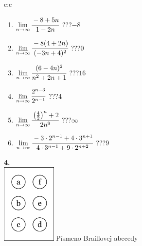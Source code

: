 \documentclass[10pt]{report}
\begin{document}
\begin{tabular}{c:c}
\begin{minipage}[c][104.5mm][t]{0.5\linewidth}
\begin{center}
\begin{minipage}{0.79\linewidth}
\begin{center}
\begin{varwidth}{\linewidth}
\begin{enumerate}
\normalsize
\item $\lim\limits_{n\to\infty}\cfrac{-8+5n}{1-2n}$\quad \dotfill\; ???\;\dotfill \quad $-8$
\item $\lim\limits_{n\to\infty}\cfrac{-8(4+2n)}{(-3n+4)^2}$\quad \dotfill\; ???\;\dotfill \quad $0$
\item $\lim\limits_{n\to\infty}\cfrac{(6-4n)^2}{n^2+2n+1}$\quad \dotfill\; ???\;\dotfill \quad $16$
\item $\lim\limits_{n\to\infty}\cfrac{2^{n-3}}{2^{n-1}}$\quad \dotfill\; ???\;\dotfill \quad $4$
\item $\lim\limits_{n\to\infty}\cfrac{\left(\frac{4}{2}\right)^n +2}{2n^{9}}$\quad \dotfill\; ???\;\dotfill \quad $\infty$
\item $\lim\limits_{n\to\infty}\cfrac{-3\cdot 2^{n-1}+4\cdot 3^{n+1}}{4\cdot 3^{n-1}+9\cdot 2^{n+2}}$\quad \dotfill\; ???\;\dotfill \quad $9$
\end{enumerate}
\end{varwidth}
\end{center}
\end{minipage}
\begin{minipage}{0.20\linewidth}
\begin{center}
{\Huge\bfseries 4.} \\[2mm]
\includegraphics[height=40mm]{../images/braille.png}
{\small Písmeno Braillovej abecedy}
\end{center}
\end{minipage}
\end{center}
\end{minipage}
%
\end{tabular}
\newpage
\thispagestyle{empty}
\end{document}
